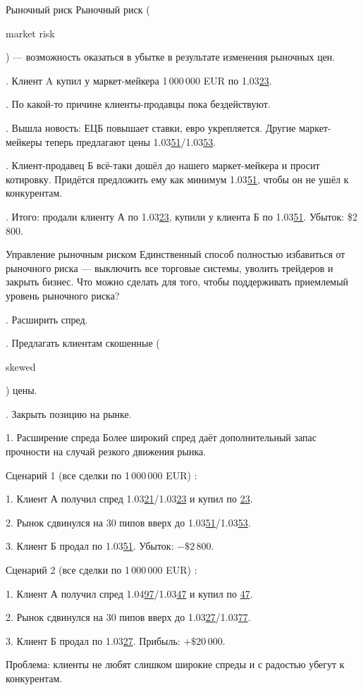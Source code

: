 \documentclass{beamer}
\newcommand{\en}[1]{\begin{otherlanguage}{english}#1\end{otherlanguage}}
\newcommand{\eurusdBigFigures}{1.03}
\newcommand{\eurusdBigFiguresMinusOne}{1.04}
\begin{document}
\begin{frame}{Рыночный риск}
\justify
\alert{Рыночный риск} (\en{market risk}) --- возможность оказаться в убытке в результате изменения рыночных цен.

. Клиент A купил у маркет-мейкера 1\,000\,000 EUR по \eurusdBigFigures\underline{23}.

. По какой-то причине клиенты-продавцы пока бездействуют.

. Вышла новость: ЕЦБ повышает ставки, евро укрепляется. Другие маркет-мейкеры теперь предлагают цены \eurusdBigFigures\underline{51}/\eurusdBigFigures\underline{53}.

. Клиент-продавец Б всё-таки дошёл до нашего маркет-мейкера и просит котировку.
Придётся предложить ему как минимум \eurusdBigFigures\underline{51}, чтобы он не ушёл к конкурентам.

. Итого: продали клиенту А по \eurusdBigFigures\underline{23}, купили у клиента Б по
\eurusdBigFigures\underline{51}. Убыток: \$2\,800.
\end{frame}



\begin{frame}{Управление рыночным риском}
\justify
Единственный способ полностью избавиться от рыночного риска --- выключить 
все торговые системы, уволить трейдеров и закрыть бизнес. Что можно сделать
для того, чтобы поддерживать приемлемый уровень рыночного риска?

. Расширить спред.

. Предлагать клиентам скошенные (\en{skewed}) цены.

. Закрыть позицию на рынке.
\end{frame}



\begin{frame}{1. Расширение спреда}
\justify
Более широкий спред даёт дополнительный запас прочности на случай резкого
движения рынка.

\justify
Сценарий 1 (все сделки по 1\,000\,000 EUR) :

1. Клиент А получил спред \eurusdBigFigures\underline{21}/\eurusdBigFigures\underline{23} и купил по \underline{23}.

2. Рынок сдвинулся на 30 пипов вверх до \eurusdBigFigures\underline{51}/\eurusdBigFigures\underline{53}.

3. Клиент Б продал по \eurusdBigFigures\underline{51}. Убыток: $-\$2\,800$.

\justify
Сценарий 2 (все сделки по 1\,000\,000 EUR) :

1. Клиент А получил спред \eurusdBigFiguresMinusOne\underline{97}/\eurusdBigFigures\underline{47} и купил по \underline{47}.

2. Рынок сдвинулся на 30 пипов вверх до \eurusdBigFigures\underline{27}/\eurusdBigFigures\underline{77}.

3. Клиент Б продал по \eurusdBigFigures\underline{27}. Прибыль: $+\$20\,000$.

\justify
Проблема: клиенты не любят слишком широкие спреды и с радостью убегут к 
конкурентам.
\end{frame}
\end{document}
